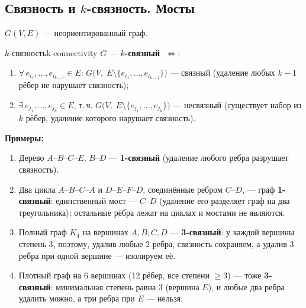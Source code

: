\bigskip
\subsection*{Связность и $k$-связность. Мосты}

$G(V, E)$ --- неориентированный граф.

\begin{defn}{$k$-связность}{k-connectivity}
$G$ --- \textbf{$k$-связный} $\;\Leftrightarrow$:
\begin{enumerate}
  \item $\forall\, e_{i_1}, \ldots, e_{i_{k-1}} \in E$:\;
        $G\bigl(V,\; E \setminus \{e_{i_1}, \ldots, e_{i_{k-1}}\}\bigr)$ --- связный
        (удаление любых $k-1$ рёбер не нарушает связность);

  \item $\exists\, e_{j_1}, \ldots, e_{j_k} \in E$, т.\,ч.\;
        $G\bigl(V,\; E \setminus \{e_{j_1}, \ldots, e_{j_k}\}\bigr)$ --- несвязный
        (существует набор из $k$ рёбер, удаление которого нарушает связность).
\end{enumerate}
\end{defn}

\textbf{Примеры:}
\begin{enumerate}
  \item %
        Дерево $A$--$B$--$C$--$E$, $B$--$D$ --- \textbf{1-связный}
        (удаление любого ребра разрушает связность).

  \item %
        Два цикла $A$--$B$--$C$--$A$ и $D$--$E$--$F$--$D$, соединённые
        ребром $C$--$D$, --- граф \textbf{1-связный}: единственный мост
        --- $C$--$D$ (удаление его разделяет граф на два треугольника);
        остальные рёбра лежат на циклах и мостами не являются.

  \item %
        Полный граф $K_4$ на вершинах $A, B, C, D$ --- \textbf{3-связный}:
        у каждой вершины степень $3$, поэтому, удалив любые $2$ ребра,
        связность сохраняем, а удалив $3$ ребра при одной вершине ---
        изолируем её.

  \item %
        Плотный граф на 6 вершинах (12 рёбер, все степени $\ge 3$) ---
        тоже \textbf{3-связный}: минимальная степень равна $3$
        (вершина $E$), и любые два ребра удалить можно, а три ребра при
        $E$ --- нельзя.
\end{enumerate}

